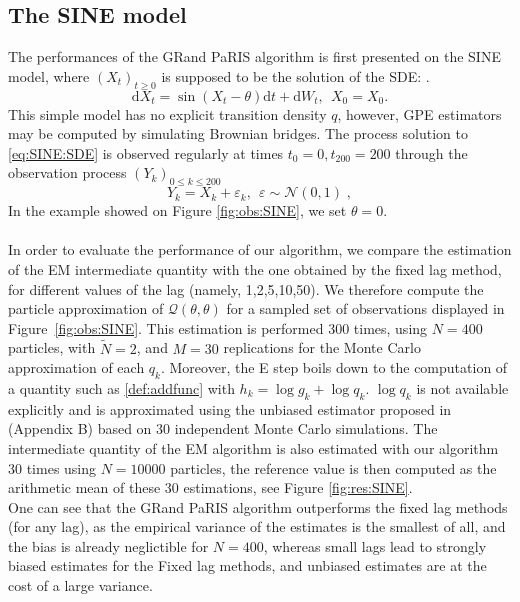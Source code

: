 \documentclass[12pt,draft]{article}
\newcommand{\rmd}{\mathrm{d}}
\newcommand{\eqsp}{\;}
\newcommand{\1}{\mathrm{1}}
\begin{document}
\subsection*{The SINE model} 
The performances of the GRand PaRIS algorithm is first presented on the SINE model, where $(X_t)_{t\geq 0}$ is supposed to be the solution of the SDE: \cite{olsson:strojby:2011}. 
\begin{equation}
\rmd X_t = \sin \left(X_t-\theta\right)\rmd t + \rmd W_t,~~X_0=X_0. \label{eq:SINE:SDE}
\end{equation}
This simple model has no explicit transition density $q$, however, GPE estimators may be computed by simulating Brownian bridges.
The process solution to \eqref{eq:SINE:SDE} is observed regularly at times $t_0=0,t_200=200$ through the observation process $(Y_k)_{0\leq k \leq 200}$
\begin{equation}
Y_k = X_k + \varepsilon_k\label{eq:obs:SINE},~~\varepsilon\sim \mathcal{N}(0,1)\eqsp,
\end{equation}
In the example showed on Figure \ref{fig:obs:SINE}, we set $\theta=0$.\\
\\
In order to evaluate the performance of our algorithm, we compare the estimation of the EM intermediate quantity with the one obtained by the fixed lag method, for different values of the lag (namely, 1,2,5,10,50). We therefore compute the particle approximation of $\mathcal{Q}(\theta,\theta)$ for a sampled set of observations displayed in Figure~\ref{fig:obs:SINE}.
This estimation is performed 300 times, using $N=400$ particles, with $\tilde{N}=2$, and $M=30$ replications for the Monte Carlo approximation of each $q_k$.  Moreover, the E step boils down to the computation of a quantity such as \eqref{def:addfunc} with $h_k= \log g_k + \log q_k$.  $\log q_k$ is not available explicitly and is approximated using the unbiased estimator proposed in \cite{olsson:strojby:2011} (Appendix B) based on 30 independent Monte Carlo simulations.
The intermediate quantity of the EM algorithm is also estimated with our algorithm 30 times using $N=10000$ particles, the reference value is then computed as the arithmetic mean of these 30 estimations, see Figure \ref{fig:res:SINE}.\\
One can see that the GRand PaRIS algorithm outperforms the fixed lag methods (for any lag), as the empirical variance of the estimates is the smallest of all, and the bias is already neglictible for $N=400$, whereas small lags lead to strongly biased estimates for the Fixed lag methods, and unbiased estimates are at the cost of a large variance.
\end{document}
